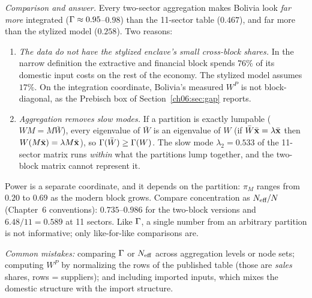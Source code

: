 \documentclass[../solutions_manual.tex]{subfiles}
\begin{document}
\emph{Comparison and answer.} Every two-sector aggregation makes Bolivia look \emph{far more} integrated ($\Gamma \approx 0.95$--$0.98$) than the 11-sector table ($0.467$), and far more than the stylized model ($0.258$). Two reasons:
\begin{enumerate}
\item \emph{The data do not have the stylized enclave's small cross-block shares.} In the narrow definition the extractive and financial block spends $76\%$ of its domestic input costs on the rest of the economy. The stylized model assumes $17\%$. On the integration coordinate, Bolivia's measured $W^P$ is not block-diagonal, as the Prebisch box of Section~\ref{ch06:sec:gap} reports.
\item \emph{Aggregation removes slow modes.} If a partition is exactly lumpable ($W M = M\bar W$), every eigenvalue of $\bar W$ is an eigenvalue of $W$ (if $\bar W\bar{\mathbf{x}} = \lambda\bar{\mathbf{x}}$ then $W(M\bar{\mathbf{x}}) = \lambda M\bar{\mathbf{x}}$), so $\Gamma(\bar W) \ge \Gamma(W)$. The slow mode $\lambda_2 = 0.533$ of the 11-sector matrix runs \emph{within} what the partitions lump together, and the two-block matrix cannot represent it.
\end{enumerate}
Power is a separate coordinate, and it depends on the partition: $\pi_M$ ranges from $0.20$ to $0.69$ as the modern block grows. Compare concentration as $N_{\text{eff}}/N$ (Chapter~6 conventions): $0.735$--$0.986$ for the two-block versions and $6.48/11 = 0.589$ at 11 sectors. Like $\Gamma$, a single number from an arbitrary partition is not informative; only like-for-like comparisons are.

\emph{Common mistakes:} comparing $\Gamma$ or $N_{\text{eff}}$ across aggregation levels or node sets; computing $W^P$ by normalizing the rows of the published table (those are \emph{sales} shares, rows = suppliers); and including imported inputs, which mixes the domestic structure with the import structure.
\end{document}
